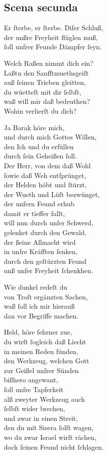 \documentclass{ees}
\newenvironment{lyrics}[1]{%
  \subsection{#1}\nopagebreak%
  \begin{lyricslist}%
  \let\voice\item%
}{%
  \end{lyricslist}%
}
\begin{document}
\begin{lyrics}{Scena secunda}
  \voice[Debora]
  Er ſterbe, er ſterbe. Diſer Schluß,\\
  der unßre Freyheit flüglen muß,\\
  ſoll unſrer Feunde Dämpfer ſeyn.

  \voice[Barak]
  Welch Raßen nimmt dich ein?\\
  Laßtu den Sanfftmuethsgeiſt\\
  auß ſeinen Trieben gleitten,\\
  du wüetteſt mit dir ſelbſt,\\
  waß will mir daß bedeuthen?\\
  Wohin verlierſt du dich?

  \voice[Debora]
  Ja Barak höre mich,\\
  und durch mich Gottes Willen,\\
  den Ich und du erfüllen\\
  durch ſein Geheißen ſoll.\\
  Der Herr, von dem daß Wohl\\
  ſowie daß Weh entſprünget,\\
  der Helden höbt und ſtürzt,\\
  der Wueth und Lüſt bezwünget,\\
  der unſern Feund erhub\\
  damit er tieffer fallt,\\
  will nun durch unſer Schwerd,\\
  gelenket durch den Gewald,\\
  der ßeine Allmacht wird\\
  in unſre Kräfften ſenken,\\
  durch den geſtürzten Feund\\
  unß unſer Freyheit ſchenkhen.

  \voice[Barak]
  Wie dunkel redeſt du\\
  von Troſt ergänzten Sachen,\\
  waß ſoll ich mir hierauß\\
  dan vor Begriffe machen.

  \voice[Debora]
  Held, höre fehrner zue,\\
  du wirſt ſogleich daß Liecht\\
  in meinen Reden fünden,\\
  den Werkzeug, welchen Gott\\
  zur Geißel unſrer Sünden\\
  bißhero angewant,\\
  ſoll unſre Tapferkeit\\
  alß zweyter Werkzeug auch\\
  ſelbſt wider brechen,\\
  und zwar in einen Streit,\\
  den du mit Sisera ſolſt wagen,\\
  wo du zwar Israel wirſt rächen,\\
  doch ſeinen Feund nicht ſchlagen.


\end{lyrics}
\end{document}
